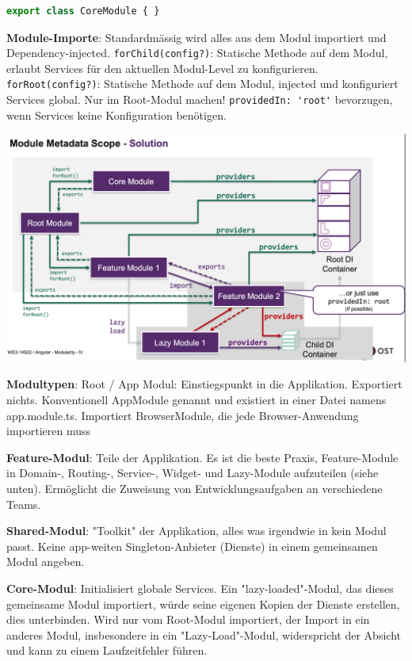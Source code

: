 \documentclass[10pt,landscape]{article}
\begin{document}
\begin{multicols}{2}
\begin{lstlisting}[language=JavaScript]
        export class CoreModule { }
        \end{lstlisting}

        \textbf{Module-Importe}: Standardmässig wird alles aus dem Modul importiert und Dependency-injected.
        \lstinline{forChild(config?)}: Statische Methode auf dem Modul, erlaubt Services für den aktuellen Modul-Level zu konfigurieren.
        \lstinline{forRoot(config?)}: Statische Methode auf dem Modul, injected und konfiguriert Services global.
        Nur im Root-Modul machen!
        \lstinline{providedIn: 'root'} bevorzugen, wenn Services keine Konfiguration benötigen.

        \includegraphics[width=\linewidth]{angular_module_big_picture}

        \textbf{Modultypen}: Root / App Modul: Einstiegspunkt in die Applikation.
        Exportiert nichts.
        Konventionell AppModule genannt und existiert in einer Datei namens app.module.ts.
        Importiert BrowserModule, die jede Browser-Anwendung importieren muss

        \textbf{Feature-Modul}: Teile der Applikation.
        Es ist die beste Praxis, Feature-Module in Domain-, Routing-, Service-, Widget- und Lazy-Module aufzuteilen (siehe unten).
        Ermöglicht die Zuweisung von Entwicklungsaufgaben an verschiedene Teams.

        \textbf{Shared-Modul}: "Toolkit" der Applikation, alles was irgendwie in kein Modul passt.
        Keine app-weiten Singleton-Anbieter (Dienste) in einem gemeinsamen Modul angeben.

        \textbf{Core-Modul}: Initialisiert globale Services.
        Ein "lazy-loaded"-Modul, das dieses gemeinsame Modul importiert, würde seine eigenen Kopien der Dienste erstellen, dies unterbinden.
        Wird nur vom Root-Modul importiert, der Import in ein anderes Modul, insbesondere in ein "Lazy-Load"-Modul, widerspricht der Absicht und kann zu einem Laufzeitfehler führen.


\end{multicols}
\end{document}
